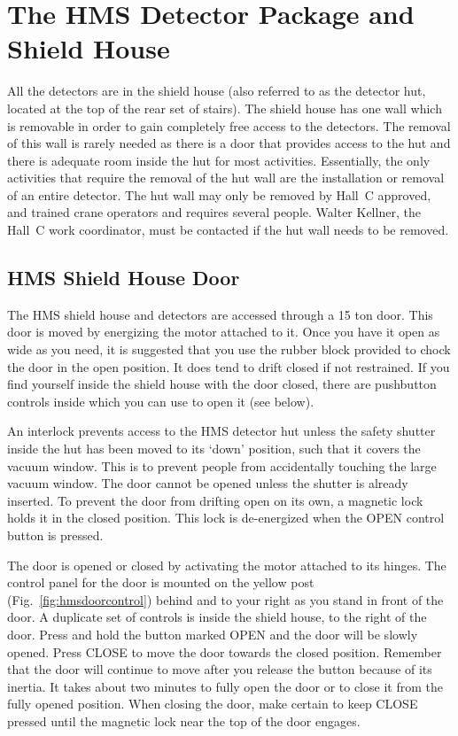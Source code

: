 
\section{The HMS Detector Package and Shield House }

All the detectors are in the shield house (also referred to as the detector hut,
located at the top of the
rear set of stairs). The shield house has one wall which is removable
in order to gain completely free access to the detectors. The removal
of this wall is rarely needed as there is a door that provides access
to the hut and there is adequate room inside the hut for most activities.
Essentially, the only activities that require the removal of the hut
wall are the installation or removal of an entire detector. The
hut wall may only be removed by Hall~C approved, and trained crane
operators and requires
several people.  Walter Kellner, the Hall~C work coordinator,  
must be contacted if the hut wall needs to be removed.

\subsection{HMS Shield House Door}
The HMS shield house and detectors are accessed through a 15 ton
door. This door is moved by energizing the motor attached to it.
Once you have it open as wide as you need, it is suggested that you
use the rubber block provided to chock the door in the open
position. It does tend to drift closed if not restrained. If you find
yourself inside the shield house with the door closed, there are
pushbutton controls inside which you can use to open it (see below).

An interlock prevents access to the HMS detector hut unless the safety
shutter inside the hut has been moved to its `down' position, such
that it covers the vacuum window. This is to prevent people from
accidentally touching the large vacuum window. The door cannot be
opened unless the shutter is already inserted. To prevent the door
from drifting open on its own, a magnetic lock holds it in the closed
position. This lock is de-energized when the OPEN control button is
pressed.

The door is opened or closed by activating the motor attached to its
hinges. The control panel for the door is mounted on the yellow post
(Fig.~\ref{fig:hmsdoorcontrol}) behind
and to your right as you stand in front of the door. A duplicate set
of controls is inside the shield house, to the right of the
door. Press and hold the button marked OPEN and the door will be
slowly opened. Press CLOSE to move the door towards the closed
position. Remember that the door will continue to move after you
release the button because of its inertia. It takes about two minutes
to fully open the door or to close it from the fully opened
position. When closing the door, make certain to keep CLOSE pressed
until the magnetic lock near the top of the door engages.


